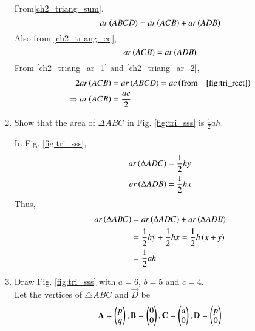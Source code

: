 \begin{enumerate}[label=\arabic*.,ref=\thesubsection.\theenumi]
\solution From\eqref{ch2_triang_sum},
\begin{equation}
\label{ch2_triang_ar_1}
ar\left(ABCD\right) = ar\left(ACB\right) + ar\left(ADB\right)
\end{equation}
Also from \eqref{ch2_triang_eq},
\begin{equation}
\label{ch2_triang_ar_2}
ar\left(ACB\right) = ar\left(ADB\right)
\end{equation}
From \eqref{ch2_triang_ar_1} and \eqref{ch2_triang_ar_2},
\begin{align}
2ar\left(ACB\right) &= ar\left(ABCD\right) = ac \left(\text{from} \quad \eqref{fig:tri_rect}\right)
\\
\Rightarrow ar\left(ACB\right) &= \frac{ac}{2}
\end{align}

\item
	Show that the area of $\Delta ABC$ in Fig. 	\ref{fig:tri_sss}	is $\frac{1}{2}ah$.


\solution In Fig. \ref{fig:tri_sss},
\begin{align}
ar\left(\Delta ADC\right) &= \frac{1}{2}hy \\
ar\left(\Delta ADB\right) &= \frac{1}{2}hx 
\end{align}
Thus,
\begin{align}
ar\left(\Delta ABC\right) &= ar\left(\Delta ADC\right) + ar\left(\Delta ADB\right) \\
&= \frac{1}{2}hy + \frac{1}{2}hx = \frac{1}{2}h\left(x+y\right) \\
&= \frac{1}{2}ah
\end{align}
%
\item Draw Fig. \ref{fig:tri_sss} with $a=6$, $b=5$  and $c=4$.  
\label{const:tri_sss}
\\
\solution Let the vertices of  $\triangle ABC$ and $\vec{D}$ be 
\begin{align}
\label{eq:tri_basic}
\mathbf{A} = \begin{pmatrix}p\\q\end{pmatrix}, \mathbf{B} = \begin{pmatrix}0\\0\end{pmatrix}, \mathbf{C} = \begin{pmatrix}a\\0\end{pmatrix}, \mathbf{D} = \begin{pmatrix}p\\0\end{pmatrix}
\end{align}
%


\end{enumerate}
